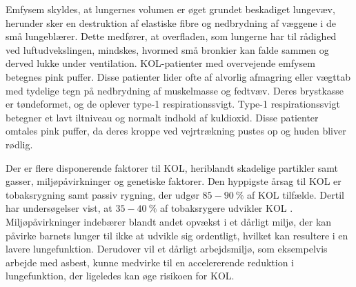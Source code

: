 Emfysem skyldes, at lungernes volumen er øget grundet beskadiget lungevæv, herunder sker en destruktion af elastiske fibre og nedbrydning af væggene i de små lungeblærer. Dette medfører, at overfladen, som lungerne har til rådighed ved luftudvekslingen, mindskes, hvormed små bronkier kan falde sammen og derved lukke under ventilation.\cite{Frausing2011a,Flaschen-Hansen2008} KOL-patienter med overvejende emfysem betegnes pink puffer. Disse patienter lider ofte af alvorlig afmagring eller vægttab med tydelige tegn på nedbrydning af muskelmasse og fedtvæv. Deres brystkasse er tøndeformet, og de oplever type-1 respirationssvigt. Type-1 respirationssvigt betegner et lavt iltniveau og normalt indhold af kuldioxid. Disse patienter omtales pink puffer, da deres kroppe ved vejrtrækning pustes op og huden bliver rødlig.\cite{Healthguidances2016}

Der er flere disponerende faktorer til KOL, heriblandt skadelige partikler samt gasser, miljøpåvirkninger og genetiske faktorer. Den hyppigste årsag til KOL er tobaksrygning samt passiv rygning, der udgør $85-90~\%$ af KOL tilfælde.\cite{Basisbogen2016,Sygdomsbyrden2015,dsam2016,Martinez2016} Dertil har undersøgelser vist, at $35-40~\%$ af tobaksrygere udvikler KOL \cite{Folkesundhed2007}.
Miljøpåvirkninger indebærer blandt andet opvækst i et dårligt miljø, der kan påvirke barnets lunger til ikke at udvikle sig ordentligt, hvilket kan resultere i en lavere lungefunktion. Derudover vil et dårligt arbejdsmiljø, som eksempelvis arbejde med asbest, kunne medvirke til en accelererende reduktion i lungefunktion, der ligeledes kan øge risikoen for KOL.\cite{Martinez2016} 
